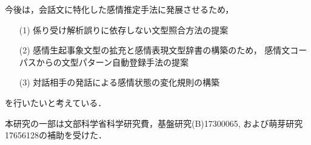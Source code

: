 \documentclass[japanese]{jnlp_1.3c}
\begin{document}
今後は，会話文に特化した感情推定手法に発展させるため，
\begin{itemize}
\item [(1)]係り受け解析誤りに依存しない文型照合方法の提案 

\item [(2)]感情生起事象文型の拡充と感情表現文型辞書の構築のため，
感情文コーパスからの文型パターン自動登録手法の提案 

\item [(3)]対話相手の発話による感情状態の変化規則の構築 
\end{itemize}

を行いたいと考えている．\\

\acknowledgment

本研究の一部は文部科学省科学研究費，基盤研究(B)17300065, 
および萌芽研究17656128の補助を受けた．
\end{document}
